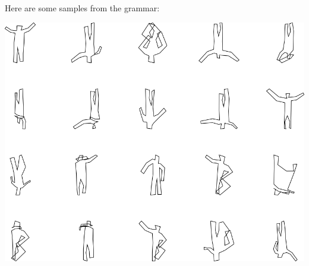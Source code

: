 Here are some samples from the grammar:

\includegraphics[width=6in]{output/3.learning/full_tuning/sdf0_iter10/samples.png}

